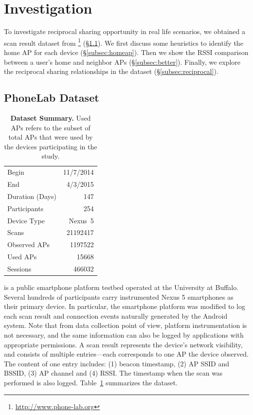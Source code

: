 \section{Investigation}
\label{sec:investigation}

To investigate reciprocal sharing opportunity in real life scenarios, we
obtained a \wifi{} scan result dataset from
\PhoneLab{}\footnote{\url{http://www.phone-lab.org}} (\S\ref{subsec:phonelab}).
We first discuss some heuristics to identify the home AP for each device
(\S\ref{subsec:homeap}). Then we show the RSSI comparison between a user's
home and neighbor APs (\S\ref{subsec:better}). Finally, we explore the
reciprocal sharing relationships in the dataset (\S\ref{subsec:reciprocal}).

\subsection{PhoneLab \wifi{} Dataset}
\label{subsec:phonelab}

\begin{table}[t]
  \begin{tabularx}{\columnwidth}{Xr}
    \toprule
    Begin & 11/7/2014 \\ 
    End & 4/3/2015 \\ 
    Duration (Days) & 147 \\ \midrule
    Participants & 254 \\
    Device Type & Nexus~5 \\ \midrule
    Scans & \num{21192417} \\
    Observed APs & \num{1197522} \\
    Used APs & \num{15668} \\ \midrule
    \wifi{} Sessions & \num{466032} \\
    \bottomrule
  \end{tabularx}
  \caption{\textbf{\PhoneLab{} \wifi{} Dataset Summary.} Used APs refers to the
  subset of total APs that were used by the devices participating in the study.}
  \label{tab:summary}
\end{table}

\PhoneLab{}\cite{phonelab-sensemine13} is a public smartphone platform
testbed operated at the University at Buffalo. Several hundreds of
participants carry instrumented Nexus 5 smartphones as their primary device.
In particular, the smartphone platform was modified to log each \wifi{} scan
result and \wifi{} connection events naturally generated by the Android
system. Note that from data collection point of view, platform
instrumentation is not necessary, and the same information can also be logged
by applications with appropriate permissions. A \wifi{} scan result
represents the device's network visibility, and consists of multiple
entries---each corresponds to one \wifi{} AP the device observed. The content
of one entry includes: (1) beacon timestamp, (2) AP SSID and BSSID, (3) AP
channel and (4) RSSI. The timestamp when the scan was performed is also
logged. Table~\ref{tab:summary} summarizes the \PhoneLab{} \wifi{} dataset.

